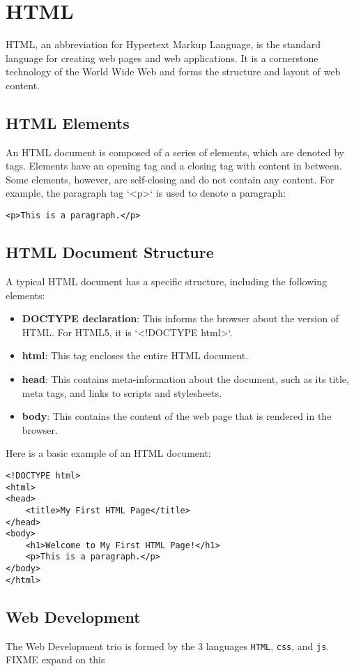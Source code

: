 \chapter{HTML}

HTML, an abbreviation for Hypertext Markup Language, is the standard
language for creating web pages and web applications. It is a
cornerstone technology of the World Wide Web and forms the structure
and layout of web content.

\section{HTML Elements}

An HTML document is composed of a series of elements, which are
denoted by tags. Elements have an opening tag and a closing tag with
content in between. Some elements, however, are self-closing and do
not contain any content. For example, the paragraph tag `<p>` is used
to denote a paragraph:

\begin{verbatim}
<p>This is a paragraph.</p>
\end{verbatim}

\section{HTML Document Structure}

A typical HTML document has a specific structure, including the following elements:

\begin{itemize}
    \item \textbf{DOCTYPE declaration}: This informs the browser about
      the version of HTML. For HTML5, it is `<!DOCTYPE html>`.
    \item \textbf{html}: This tag encloses the entire HTML document.
    \item \textbf{head}: This contains meta-information about the
      document, such as its title, meta tags, and links to scripts and
      stylesheets.
    \item \textbf{body}: This contains the content of the web page
      that is rendered in the browser.
\end{itemize}

Here is a basic example of an HTML document:

\begin{verbatim}
<!DOCTYPE html>
<html>
<head>
    <title>My First HTML Page</title>
</head>
<body>
    <h1>Welcome to My First HTML Page!</h1>
    <p>This is a paragraph.</p>
</body>
</html>
\end{verbatim}

\section{Web Development}
The Web Development trio is formed by the 3 languages \verb|HTML|, \verb|css|, and \verb|js|. 
FIXME expand on this
